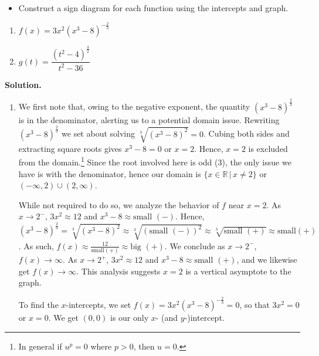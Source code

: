 \begin{ex}
\begin{itemize}
\begin{itemize}
\end{itemize}

\item Construct a sign diagram for each function using the intercepts and graph.
\end{itemize}

\begin{multicols}{2}
\begin{enumerate}

\item  $f(x) = 3x^2(x^3-8)^{-\frac{2}{3}}$ 

\item  $g(t) = \dfrac{(t^2-4)^{\frac{3}{2}}}{t^2-36}$

\end{enumerate}
\end{multicols}

{\bf Solution.}

\begin{enumerate}

\item We first note that, owing to the negative exponent, the quantity $(x^3-8)^{\frac{2}{3}}$ is in the denominator, alerting us to a potential domain issue.  Rewriting $(x^3-8)^{\frac{2}{3}}$ we set about solving $\sqrt[3]{(x^3-8)^2} = 0$.  Cubing both sides and extracting square roots gives $x^3-8=0$ or $x =2$.   Hence, $x =2$ is excluded from the domain.\footnote{In general if $u^{p} = 0$ where $p>0$, then $u =0$.}   Since the root involved here is odd ($3$), the only issue we have is with the denominator, hence our domain is $\{ x \in \mathbb{R} \, | \, x \neq 2 \}$ or $(-\infty, 2) \cup (2, \infty)$.  

While not required to do so, we analyze the behavior of $f$ near $x = 2$.  As $x \rightarrow 2^{-}$, $3x^2 \approx 12$ and $x^3-8 \approx \text{small $(-)$}$.  Hence, $(x^3-8)^{\frac{2}{3}} =\sqrt[3]{(x^3-8)^2} \approx \sqrt[3]{(\text{small $(-)$})^2} \approx \sqrt[3]{\text{small $(+)$}} \approx \text{small$(+)$}$.  As such,  $f(x) \approx \frac{12}{ \text{small$(+)$}} \approx \text{big $(+)$}$.  We conclude as $x \rightarrow 2^{-}$, $f(x) \rightarrow \infty$. As $x \rightarrow 2^{+}$, $3x^2 \approx 12$ and $x^3 - 8 \approx \text{small $(+)$}$, and we likewise get $f(x) \rightarrow \infty$.  This analysis suggests $x=2$ is a vertical asymptote to the graph.


To find the $x$-intercepts, we set $f(x) =  3x^2(x^3-8)^{-\frac{2}{3}} = 0$, so that $3x^2 = 0$ or $x = 0$.  We get $(0,0)$ is our only $x$- (and $y$-)intercept.  


\end{enumerate}
\end{ex}
